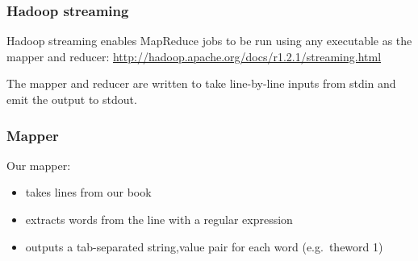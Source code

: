 \begin{Shaded}
\begin{Highlighting}[]
\NormalTok{$ } 
\end{Highlighting}
\end{Shaded}

\begin{Shaded}
\begin{Highlighting}[]
\NormalTok{$ } 


 
 
 
\end{Highlighting}
\end{Shaded}

\subsubsection{Hadoop streaming}\label{hadoop-streaming}

Hadoop streaming enables MapReduce jobs to be run using any executable
as the mapper and reducer:
\url{http://hadoop.apache.org/docs/r1.2.1/streaming.html}

The mapper and reducer are written to take line-by-line inputs from
stdin and emit the output to stdout.

\subsubsection{Mapper}\label{mapper}

Our mapper:

\begin{itemize}
\itemsep1pt\parskip0pt
\item
  takes lines from our book
\item
  extracts words from the line with a regular expression
\item
  outputs a tab-separated string,value pair for each word (e.g.~theword
  1)
\end{itemize}

